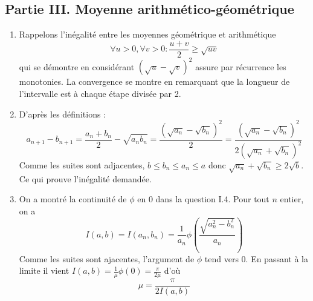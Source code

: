 \subsection*{Partie III. Moyenne arithmético-géométrique}
\begin{enumerate}
\item  Rappelons l'inégalité entre les  moyennes g\'{e}om\'{e}trique et arithm\'{e}tique 
\begin{displaymath}
 \forall u>0, \forall v>0 : \dfrac{u+v}{2}\geq \sqrt{uv}
\end{displaymath}
qui se démontre en considérant $(\sqrt{u}-\sqrt{v})^2$ assure par r\'{e}currence les monotonies. La convergence
se montre en remarquant que la longueur de l'intervalle est \`{a} chaque \'{e}tape divis\'{e}e par 2.

\item D'après les définitions :
\begin{displaymath}
 a_{n+1}-b_{n+1}= \frac{a_n+b_n}{2}-\sqrt{a_n b_n}=\frac{(\sqrt{a_n}-\sqrt{b_n})^2}{2}
=\frac{(\sqrt{a_n}-\sqrt{b_n})^2}{2(\sqrt{a_n}+\sqrt{b_n})^2}
\end{displaymath}
Comme les suites sont adjacentes, $b\leq b_n \leq a_n \leq a$ donc $\sqrt{a_n}+\sqrt{b_n} \geq 2\sqrt{b}$. Ce qui prouve l'inégalité demandée.

\item  On a montré la continuit\'{e} de $\phi $ en $0$ dans la question I.4. Pour tout $n$ entier, on a 
\begin{displaymath}
I(a,b) = I(a_{n},b_{n}) = \frac{1}{a_{n}}\phi (\frac{\sqrt{a_{n}^{2}-b_{n}^{2}}}{a_{n}})  
\end{displaymath}
Comme les suites sont ajacentes, l'argument de $\phi $ tend vers 0. En passant \`{a} la limite il vient $I(a,b)=\frac{1}{\mu }\phi (0)=\frac{\pi }{2\mu }$ d'où
\begin{displaymath}
\mu =\frac{\pi }{2I(a,b)}  
\end{displaymath}
\end{enumerate}

